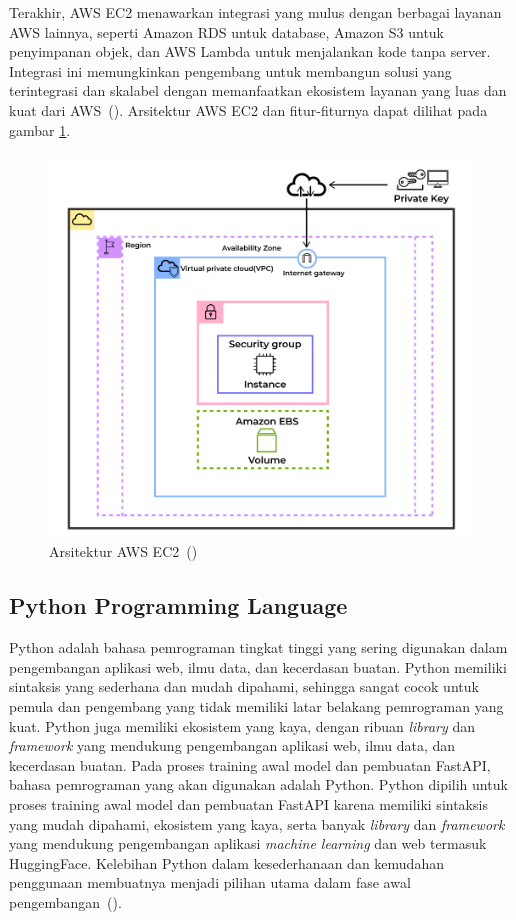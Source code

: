 Terakhir, AWS EC2 menawarkan integrasi yang mulus dengan berbagai layanan AWS lainnya, seperti Amazon RDS untuk database, Amazon S3 untuk penyimpanan objek, dan AWS Lambda untuk menjalankan kode tanpa server. Integrasi ini memungkinkan pengembang untuk membangun solusi yang terintegrasi dan skalabel dengan memanfaatkan ekosistem layanan yang luas dan kuat dari AWS~(\cite{chen2023}). 
Arsitektur AWS EC2 dan fitur-fiturnya dapat dilihat 
pada gambar \ref{fig:awsEC2Architecture}.

\begin{figure}[H]
  \centering
  \includegraphics[scale=0.4]{gambar/ec2arsitektur.png}
  \caption{Arsitektur AWS EC2~(\cite{geeksforgeeks})}
  \label{fig:awsEC2Architecture}
\end{figure}


\subsection{Python Programming Language}
Python adalah bahasa pemrograman tingkat tinggi yang sering
digunakan dalam pengembangan aplikasi web, ilmu data, dan
kecerdasan buatan. Python memiliki sintaksis yang sederhana
dan mudah dipahami, sehingga sangat cocok untuk pemula dan
pengembang yang tidak memiliki latar belakang pemrograman
yang kuat. Python juga memiliki ekosistem yang kaya, dengan
ribuan \emph{library} dan \emph{framework} yang mendukung
pengembangan aplikasi web, ilmu data, dan kecerdasan buatan.
Pada proses training awal model dan pembuatan FastAPI, bahasa 
pemrograman yang akan digunakan adalah Python. Python dipilih 
untuk proses training awal model dan pembuatan FastAPI karena 
memiliki sintaksis yang mudah dipahami, ekosistem yang kaya, 
serta banyak \emph{library} dan \emph{framework} yang 
mendukung pengembangan aplikasi \emph{machine learning} dan 
web termasuk HuggingFace. Kelebihan Python dalam kesederhanaan 
dan kemudahan penggunaan membuatnya menjadi pilihan utama dalam 
fase awal pengembangan~(\cite{sharma2020}).


